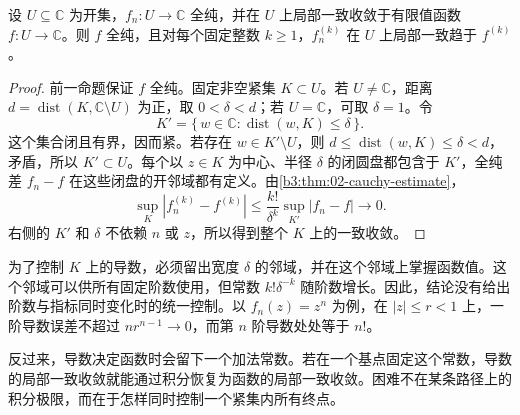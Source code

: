 \begin{proposition}\label{b3:prop:04-derivative-convergence}
设 \(U\subseteq\mathbb C\) 为开集，\(f_n:U\to\mathbb C\) 全纯，并在 \(U\) 上局部一致收敛于有限值函数 \(f:U\to\mathbb C\)。则 \(f\) 全纯，且对每个固定整数 \(k\ge1\)，\(f_n^{(k)}\) 在 \(U\) 上局部一致趋于 \(f^{(k)}\)。
\end{proposition}
\begin{proof}
前一命题保证 \(f\) 全纯。固定非空紧集 \(K\subset U\)。若 \(U\ne\mathbb C\)，距离 \(d=\operatorname{dist}(K,\mathbb C\setminus U)\) 为正，取 \(0<\delta<d\)；若 \(U=\mathbb C\)，可取 \(\delta=1\)。令
\[
 K'=\{\,w\in\mathbb C:\operatorname{dist}(w,K)\le\delta\,\}.
\]
这个集合闭且有界，因而紧。若存在 \(w\in K'\setminus U\)，则 \(d\le\operatorname{dist}(w,K)\le\delta<d\)，矛盾，所以 \(K'\subset U\)。每个以 \(z\in K\) 为中心、半径 \(\delta\) 的闭圆盘都包含于 \(K'\)，全纯差 \(f_n-f\) 在这些闭盘的开邻域都有定义。由\cref{b3:thm:02-cauchy-estimate}，
\begin{equation}\label{b3:eq:04-derivative-error}
 \sup_K|f_n^{(k)}-f^{(k)}|
 \le \frac{k!}{\delta^k}\sup_{K'}|f_n-f|\longrightarrow0.
\end{equation}
右侧的 \(K'\) 和 \(\delta\) 不依赖 \(n\) 或 \(z\)，所以得到整个 \(K\) 上的一致收敛。
\end{proof}

为了控制 \(K\) 上的导数，必须留出宽度 \(\delta\) 的邻域，并在这个邻域上掌握函数值。这个邻域可以供所有固定阶数使用，但常数 \(k!\delta^{-k}\) 随阶数增长。因此，结论没有给出阶数与指标同时变化时的统一控制。以 \(f_n(z)=z^n\) 为例，在 \(|z|\le r<1\) 上，一阶导数误差不超过 \(nr^{n-1}\to0\)，而第 \(n\) 阶导数处处等于 \(n!\)。

\ProseParagraphBreak

反过来，导数决定函数时会留下一个加法常数。若在一个基点固定这个常数，导数的局部一致收敛就能通过积分恢复为函数的局部一致收敛。困难不在某条路径上的积分极限，而在于怎样同时控制一个紧集内所有终点。

